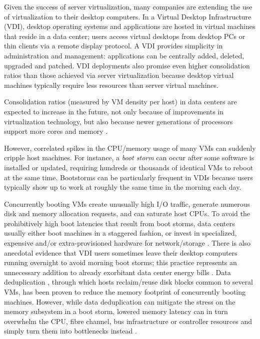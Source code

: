 Given the success of server virtualization, many companies are 
extending the use of virtualization to their desktop computers.
In a Virtual Desktop Infrastructure \cite{vmwarevdi} (VDI), 
desktop operating systems and applications are hosted in 
virtual machines that reside in a data center; 
users access virtual desktops from desktop PCs or thin clients
via a remote display protocol. A VDI provides simplicity 
in administration and management: applications
can be centrally added, deleted, upgraded and patched. 
VDI deployments also promise even
higher consolidation ratios than those achieved via server virtualization
because desktop virtual machines typically require
less resources than server virtual machines.

Consolidation ratios (measured by VM density per host) in data centers
are expected to increase in the future, not only because of
improvements in virtualization technology, but also because
newer generations of processors support more cores and 
memory \cite{hansen2010lithium}. 



However, correlated spikes in the CPU/memory usage of many VMs can suddenly 
cripple host machines. For instance, a \emph{boot storm} \cite{hansen2010lithium, 
liao2011vmstore, meng2010tide, rajan2010vdc, vaghani2010virtual}
can occur after some software is installed or updated, requiring hundreds 
or thousands of identical VMs to reboot at the same time.
Bootstorms can be particularly frequent in VDIs because 
users typically show up to work at roughly the same time
in the morning each day. 

Concurrently booting VMs create unusually high I/O traffic,
generate numerous disk and memory allocation requests,
and can saturate host CPUs. 
To avoid the prohibitively high boot latencies that  
result from boot storms, data centers usually either 
boot machines in a staggered fashion, or invest in specialized,
expensive and/or extra-provisioned hardware for network/storage \cite{highperfnas, liao2011vmstore}.
There is also anecdotal evidence that VDI users sometimes leave their desktop computers running
overnight to avoid morning boot storms; this practice
represents an unnecessary addition to already exorbitant
data center energy bills \cite{qureshi2009bills}. Data deduplication \cite{clements2009deduplication},
through which hosts reclaim/reuse disk blocks common to several VMs, 
has been proven to reduce the memory footprint of concurrently
booting machines. However, while data deduplication can mitigate the stress on the memory subsystem in
a boot storm, lowered memory latency can in turn overwhelm the CPU, 
fibre channel, bus infrastructure or controller resources 
and simply turn them into bottlenecks instead \cite{netappstorm}. 

